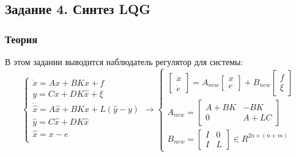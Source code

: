 \subsection{Задание 4. Синтез LQG}

\subsubsection{Теория}
В этом задании выводится наблюдатель регулятор для системы:
\[
        \begin{cases}
                \dot{x} = A x + B  K \hat{x} + f \\
                y = Cx + DK\hat{x} + \xi \\
                \dot{\hat{x}} = A \hat{x} + B  K \hat{x} + L(\hat{y} - y) \\
                \hat{y} = C \hat{x} + D K \hat{x} \\
                \hat{x} = x - e \\
        \end{cases} \rightarrow
        \begin{cases}
            \begin{bmatrix} 
                \dot{x} \\
                \dot{e}
            \end{bmatrix} = 
            A_{new}
            \begin{bmatrix} 
              x \\
              e
            \end{bmatrix} 
          + B_{new} 
          \begin{bmatrix} 
            f \\
            \xi
          \end{bmatrix} 
            \\
            A_{new} = 
            \begin{bmatrix} 
                A + BK & -BK\\
                0 & A + LC
            \end{bmatrix} \\
            B_{new} = 
            \begin{bmatrix} 
                I & 0\\
                I & L
            \end{bmatrix} \in R^{2n \times (n + m)}
         \end{cases}
\]

